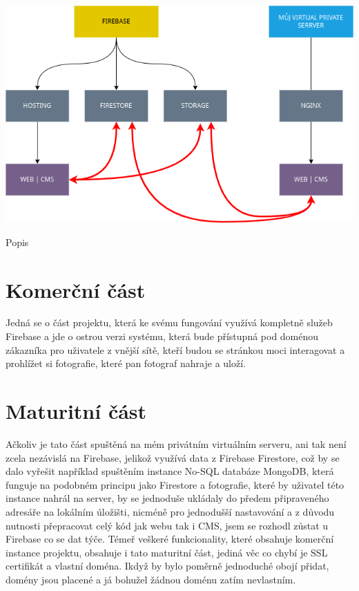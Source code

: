 \documentclass[12pt,a4paper]{report}
\begin{document}
  \vspace*{0.5cm}
  \noindent\includegraphics[width=\linewidth]{project_structure.png}
  \begin{center}
    Popis
  \end{center}
  \vspace*{0.5cm}
  
  \section{Komerční část}
  Jedná se o část projektu, která ke svému fungování využívá kompletně služeb Firebase 
  a jde o ostrou verzi systému, která bude přístupná pod doménou zákazníka pro uživatele z vnější sítě, kteří budou se stránkou moci 
  interagovat a prohlížet si fotografie, které pan fotograf nahraje a uloží.
  \section{Maturitní část}
  Ačkoliv je tato část spuštěná na mém privátním virtuálním serveru, ani tak není zcela
  nezávislá na Firebase, jelikož využívá data z Firebase Firestore, což by se dalo vyřešit
  například spuštěním instance No-SQL databáze MongoDB, která funguje na podobném principu jako 
  Firestore a fotografie, které by uživatel této instance nahrál na server, by se jednoduše ukládaly
  do předem připraveného adresáře na lokálním úložišti, nicméně pro jednodušší nastavování a z důvodu nutnosti
  přepracovat celý kód jak webu tak i CMS, jsem se rozhodl zůstat u Firebase co se dat týče. 
  Témeř veškeré funkcionality, které obsahuje komerční instance projektu, obsahuje i tato maturitní část, 
  jediná věc co chybí je SSL certifikát a vlastní doména. Ikdyž by bylo poměrně jednoduché obojí přidat,
  domény jsou placené a já bohužel žádnou doménu zatím nevlastním.
 
\end{document}
